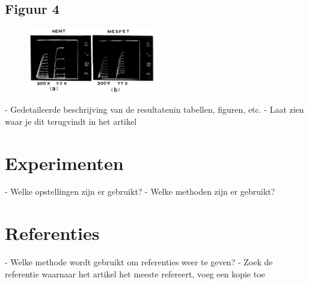 \documentclass[11pt]{report}
\begin{document}
\section{Figuur 4}
\begin{figure}
\centering
\includegraphics[width=0.5\textwidth]{CV-characteristics.png}
\caption{}
\end{figure}

  - Gedetaileerde beschrijving van de resultatenin tabellen, figuren, etc.
  - Laat zien waar je dit terugvindt in het artikel

\chapter{Experimenten}
  - Welke opstellingen zijn er gebruikt?
  - Welke methoden zijn er gebruikt?

\chapter{Referenties}
  - Welke methode wordt gebruikt om referenties weer te geven?
  - Zoek de referentie waarnaar het artikel het meeste refereert, voeg een kopie toe




\appendix
\end{document}

